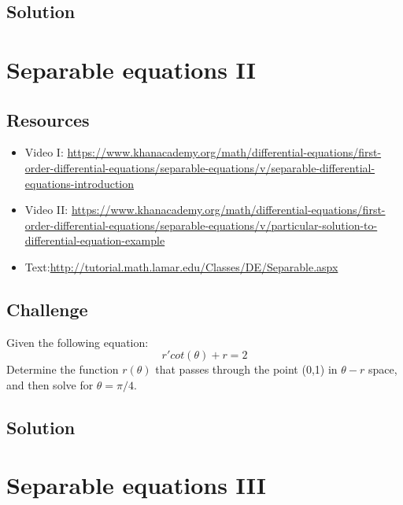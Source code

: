 \subsection*{Solution}
\six{}


\timebox



\newpage
\section{Separable equations II}

\subsection*{Resources}
\begin{itemize}
    \item Video I: \url{https://www.khanacademy.org/math/differential-equations/first-order-differential-equations/separable-equations/v/separable-differential-equations-introduction} 
    \item Video II: \url{https://www.khanacademy.org/math/differential-equations/first-order-differential-equations/separable-equations/v/particular-solution-to-differential-equation-example}
    \item Text:\url{http://tutorial.math.lamar.edu/Classes/DE/Separable.aspx}
\end{itemize}

\subsection*{Challenge}
Given the following equation:
\begin{equation}
    r' cot(\theta) + r = 2
\end{equation}
Determine the function $r(\theta)$ that passes through the point (0,1) in $\theta-r$ space, and then solve for $\theta = \pi/4$.

\subsection*{Solution}
\six{}


\timebox



\newpage
\section{Separable equations III}

